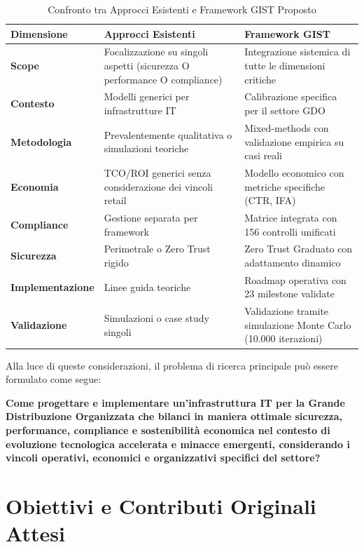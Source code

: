 \begin{table}[htbp]
\centering
 \small
 \sffamily 
\caption{Confronto tra Approcci Esistenti e Framework GIST Proposto}
\label{tab:confronto_approcci}
\begin{tabularx}{\textwidth}{@{}lXX@{}}
\toprule
\textbf{Dimensione} & \textbf{Approcci Esistenti} & \textbf{Framework GIST} \\
\midrule
\textbf{Scope} & Focalizzazione su singoli aspetti (sicurezza O performance O compliance) & Integrazione sistemica di tutte le dimensioni critiche \\
\textbf{Contesto} & Modelli generici per infrastrutture IT & Calibrazione specifica per il settore GDO \\
\textbf{Metodologia} & Prevalentemente qualitativa o simulazioni teoriche & Mixed-methods con validazione empirica su casi reali \\
\textbf{Economia} & TCO/ROI generici senza considerazione dei vincoli retail & Modello economico con metriche specifiche (CTR, IFA) \\
\textbf{Compliance} & Gestione separata per framework & Matrice integrata con 156 controlli unificati \\
\textbf{Sicurezza} & Perimetrale o Zero Trust rigido & Zero Trust Graduato con adattamento dinamico \\
\textbf{Implementazione} & Linee guida teoriche & Roadmap operativa con 23 milestone validate \\
\textbf{Validazione} & Simulazioni o case study singoli & Validazione tramite simulazione Monte Carlo (10.000 iterazioni) \\
\bottomrule
\end{tabularx}
\end{table}

Alla luce di queste considerazioni, il problema di ricerca principale può essere formulato come segue:
\label{ssec:domanda_ricerca}

\textbf{Come progettare e implementare un'infrastruttura IT per la Grande Distribuzione Organizzata che bilanci in maniera ottimale sicurezza, performance, compliance e sostenibilità economica nel contesto di evoluzione tecnologica accelerata e minacce emergenti, considerando i vincoli operativi, economici e organizzativi specifici del settore?}

\section{Obiettivi e Contributi Originali Attesi}

